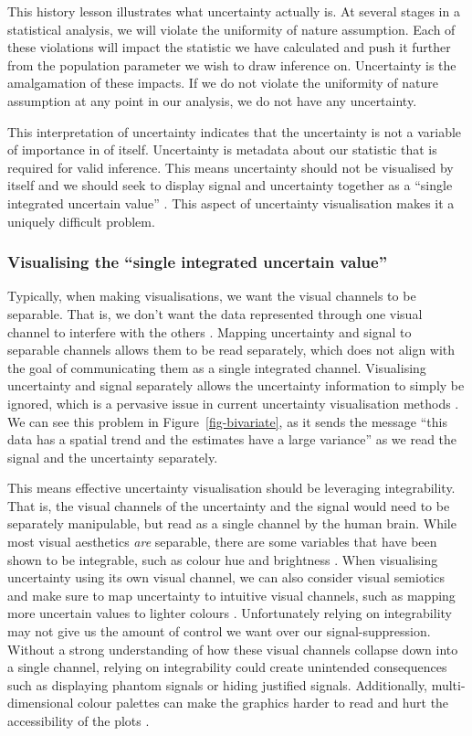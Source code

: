 \documentclass[
  12pt]{article}
\begin{document}
This history lesson illustrates what uncertainty actually is. At several
stages in a statistical analysis, we will violate the uniformity of
nature assumption. Each of these violations will impact the statistic we
have calculated and push it further from the population parameter we
wish to draw inference on. Uncertainty is the amalgamation of these
impacts. If we do not violate the uniformity of nature assumption at any
point in our analysis, we do not have any uncertainty.

This interpretation of uncertainty indicates that the uncertainty is not
a variable of importance in of itself. Uncertainty is metadata about our
statistic that is required for valid inference. This means uncertainty
should not be visualised by itself and we should seek to display signal
and uncertainty together as a ``single integrated uncertain value''
\citep{Kinkeldey2014}. This aspect of uncertainty visualisation makes it
a uniquely difficult problem.

\subsubsection{Visualising the ``single integrated uncertain
value''}\label{visualising-the-single-integrated-uncertain-value}

Typically, when making visualisations, we want the visual channels to be
separable. That is, we don't want the data represented through one
visual channel to interfere with the others \citep{Smart2019}. Mapping
uncertainty and signal to separable channels allows them to be read
separately, which does not align with the goal of communicating them as
a single integrated channel. Visualising uncertainty and signal
separately allows the uncertainty information to simply be ignored,
which is a pervasive issue in current uncertainty visualisation methods
\citep{uncertchap2022}. We can see this problem in
Figure~\ref{fig-bivariate}, as it sends the message ``this data has a
spatial trend and the estimates have a large variance'' as we read the
signal and the uncertainty separately.

This means effective uncertainty visualisation should be leveraging
integrability. That is, the visual channels of the uncertainty and the
signal would need to be separately manipulable, but read as a single
channel by the human brain. While most visual aesthetics \emph{are}
separable, there are some variables that have been shown to be
integrable, such as colour hue and brightness \citep{Vanderplas2020}.
When visualising uncertainty using its own visual channel, we can also
consider visual semiotics and make sure to map uncertainty to intuitive
visual channels, such as mapping more uncertain values to lighter
colours \citep{Maceachren2012}. Unfortunately relying on integrability
may not give us the amount of control we want over our
signal-suppression. Without a strong understanding of how these visual
channels collapse down into a single channel, relying on integrability
could create unintended consequences such as displaying phantom signals
or hiding justified signals. Additionally, multi-dimensional colour
palettes can make the graphics harder to read and hurt the accessibility
of the plots \citep{Vanderplas2015}.
\end{document}
